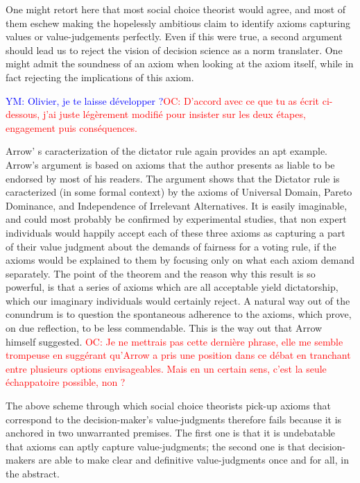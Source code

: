 \documentclass[preprint,11pt]{elsarticle}
\newcommand{\commentYM}[1]{\textcolor{blue}{YM: #1}}
\newcommand{\commentOC}[1]{\textcolor{red}{OC: #1}}
\begin{document}
One might retort here that most social choice theorist would agree, and most of them eschew making the hopelessly ambitious claim to identify axioms capturing values or value-judgements perfectly. Even if this were true, a second argument should lead us to reject the vision of decision science as a norm translater. One might admit the soundness of an axiom when looking at the axiom itself, while in fact rejecting the implications of this axiom.

\commentYM{Olivier, je te laisse développer ?}\commentOC{D’accord avec ce que tu as écrit ci-dessous, j’ai juste légèrement modifié pour insister sur les deux étapes, engagement puis conséquences.}

Arrow' s  caracterization of the dictator rule \cite{arrow_social_2012} again provides an apt example. Arrow's argument is based on axioms that the author presents as liable to be endorsed by most of his readers. The argument shows that the Dictator rule is caracterized (in some formal context) by the axioms of Universal Domain, Pareto Dominance, and Independence of Irrelevant Alternatives. It is easily imaginable, and could most probably be confirmed by experimental studies, that non expert individuals would happily accept each of these three axioms as capturing a part of their value judgment about the demands of fairness for a voting rule, if the axioms would be explained to them by focusing only on what each axiom demand separately. The point of the theorem and the reason why this result is so powerful, is that a series of axioms which are all acceptable yield dictatorship, which our imaginary individuals would certainly reject. A natural way out of the conundrum is to question the spontaneous adherence to the axioms, which prove, on due reflection, to be less commendable. This is the way out that Arrow himself suggested. \commentOC{Je ne mettrais pas cette dernière phrase, elle me semble trompeuse en suggérant qu’Arrow a pris une position dans ce débat en tranchant entre plusieurs options envisageables. Mais en un certain sens, c’est la seule échappatoire possible, non ?}


The above scheme through which social choice theorists pick-up axioms that correspond to the decision-maker's value-judgments therefore fails because it is anchored in two unwarranted premises. The first one is that it is undebatable that axioms can aptly capture value-judgments; the second one is that decision-makers are able to make clear and definitive value-judgments once and for all, in the abstract.
\end{document}
